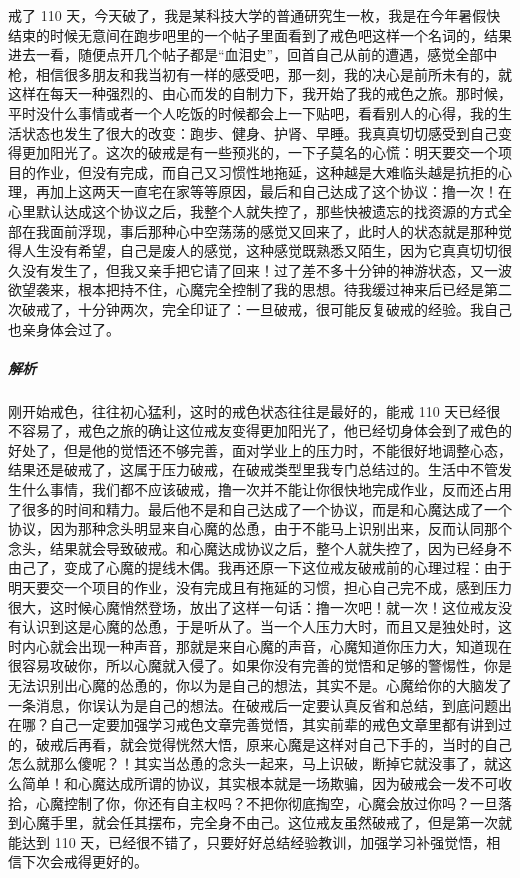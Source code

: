\begin{case}
    戒了 110 天，今天破了，我是某科技大学的普通研究生一枚，我是在今年暑假快结束的时候无意间在跑步吧里的一个帖子里面看到了戒色吧这样一个名词的，结果进去一看，随便点开几个帖子都是“血泪史”，回首自己从前的遭遇，感觉全部中枪，相信很多朋友和我当初有一样的感受吧，那一刻，我的决心是前所未有的，就这样在每天一种强烈的、由心而发的自制力下，我开始了我的戒色之旅。那时候，平时没什么事情或者一个人吃饭的时候都会上一下贴吧，看看别人的心得，我的生活状态也发生了很大的改变：跑步、健身、护肾、早睡。我真真切切感受到自己变得更加阳光了。这次的破戒是有一些预兆的，一下子莫名的心慌：明天要交一个项目的作业，但没有完成，而自己又习惯性地拖延，这种越是大难临头越是抗拒的心理，再加上这两天一直宅在家等等原因，最后和自己达成了这个协议：撸一次！在心里默认达成这个协议之后，我整个人就失控了，那些快被遗忘的找资源的方式全部在我面前浮现，事后那种心中空荡荡的感觉又回来了，此时人的状态就是那种觉得人生没有希望，自己是废人的感觉，这种感觉既熟悉又陌生，因为它真真切切很久没有发生了，但我又亲手把它请了回来！过了差不多十分钟的神游状态，又一波欲望袭来，根本把持不住，心魔完全控制了我的思想。待我缓过神来后已经是第二次破戒了，十分钟两次，完全印证了：一旦破戒，很可能反复破戒的经验。我自己也亲身体会过了。
    \subparagraph{解析} 刚开始戒色，往往初心猛利，这时的戒色状态往往是最好的，能戒 110 天已经很不容易了，戒色之旅的确让这位戒友变得更加阳光了，他已经切身体会到了戒色的好处了，但是他的觉悟还不够完善，面对学业上的压力时，不能很好地调整心态，结果还是破戒了，这属于压力破戒，在破戒类型里我专门总结过的。生活中不管发生什么事情，我们都不应该破戒，撸一次并不能让你很快地完成作业，反而还占用了很多的时间和精力。最后他不是和自己达成了一个协议，而是和心魔达成了一个协议，因为那种念头明显来自心魔的怂恿，由于不能马上识别出来，反而认同那个念头，结果就会导致破戒。和心魔达成协议之后，整个人就失控了，因为已经身不由己了，变成了心魔的提线木偶。我再还原一下这位戒友破戒前的心理过程：由于明天要交一个项目的作业，没有完成且有拖延的习惯，担心自己完不成，感到压力很大，这时候心魔悄然登场，放出了这样一句话：撸一次吧！就一次！这位戒友没有认识到这是心魔的怂恿，于是听从了。当一个人压力大时，而且又是独处时，这时内心就会出现一种声音，那就是来自心魔的声音，心魔知道你压力大，知道现在很容易攻破你，所以心魔就入侵了。如果你没有完善的觉悟和足够的警惕性，你是无法识别出心魔的怂恿的，你以为是自己的想法，其实不是。心魔给你的大脑发了一条消息，你误认为是自己的想法。在破戒后一定要认真反省和总结，到底问题出在哪？自己一定要加强学习戒色文章完善觉悟，其实前辈的戒色文章里都有讲到过的，破戒后再看，就会觉得恍然大悟，原来心魔是这样对自己下手的，当时的自己怎么就那么傻呢？！其实当怂恿的念头一起来，马上识破，断掉它就没事了，就这么简单！和心魔达成所谓的协议，其实根本就是一场欺骗，因为破戒会一发不可收拾，心魔控制了你，你还有自主权吗？不把你彻底掏空，心魔会放过你吗？一旦落到心魔手里，就会任其摆布，完全身不由己。这位戒友虽然破戒了，但是第一次就能达到 110 天，已经很不错了，只要好好总结经验教训，加强学习补强觉悟，相信下次会戒得更好的。
\end{case}

